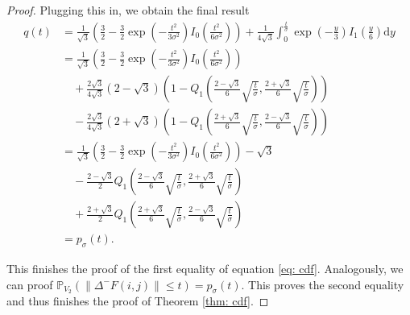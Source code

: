 \documentclass[a4paper,12pt]{article}
\newcommand{\norm}[1]{\lVert#1\rVert}
\theoremstyle{plain}
\theoremstyle{definition}
\begin{document}
\begin{proof}
	Plugging this in, we obtain the final result
	\begin{align*}
		q(t) &= \frac{1}{\sqrt{3}} \left( \frac{3}{2} - \frac{3}{2} \exp \left( - \frac{t^2}{3 \sigma^2} \right) I_0 \left( \frac{t^2}{6 \sigma^2} \right) \right) + \frac{1}{4 \sqrt{3}} \int_0^\frac{t}{\sigma} \exp \left( - \frac{y}{3} \right) I_1 \left( \frac{y}{6} \right) \mathrm{d}y \\
		&= \frac{1}{\sqrt{3}} \left( \frac{3}{2} - \frac{3}{2} \exp \left( - \frac{t^2}{3 \sigma^2} \right) I_0 \left( \frac{t^2}{6 \sigma^2} \right) \right) \\
		&\quad + \frac{2 \sqrt{3}}{4 \sqrt{3}} (2 - \sqrt{3}) \left( 1 - Q_1 \left( \frac{2 - \sqrt{3}}{6} \sqrt{\frac{t}{\sigma}}, \frac{2 + \sqrt{3}}{6} \sqrt{\frac{t}{\sigma}} \right) \right) \\
		&\quad - \frac{2 \sqrt{3}}{4 \sqrt{3}} (2 + \sqrt{3}) \left( 1 - Q_1 \left( \frac{2 + \sqrt{3}}{6} \sqrt{\frac{t}{\sigma}}, \frac{2 - \sqrt{3}}{6} \sqrt{\frac{t}{\sigma}} \right) \right) \\
		&= \frac{1}{\sqrt{3}} \left( \frac{3}{2} - \frac{3}{2} \exp \left( - \frac{t^2}{3 \sigma^2} \right) I_0 \left( \frac{t^2}{6 \sigma^2} \right) \right) - \sqrt{3} \\
		&\quad - \frac{2 - \sqrt{3}}{2} Q_1 \left( \frac{2 - \sqrt{3}}{6} \sqrt{\frac{t}{\sigma}}, \frac{2 + \sqrt{3}}{6} \sqrt{\frac{t}{\sigma}} \right) \\
		&\quad + \frac{2 + \sqrt{3}}{2} Q_1 \left( \frac{2 + \sqrt{3}}{6} \sqrt{\frac{t}{\sigma}}, \frac{2 - \sqrt{3}}{6} \sqrt{\frac{t}{\sigma}} \right) \\
		&= p_\sigma(t).
	\end{align*}
	
	This finishes the proof of the first equality of equation \eqref{eq: cdf}. Analogously, we can proof $\mathbb{P}_{V_2}( \norm{\Delta^- F(i, j)} \leq t ) = p_\sigma(t)$. This proves the second equality and thus finishes the proof of Theorem \ref{thm: cdf}.
\end{proof}
\end{document}

